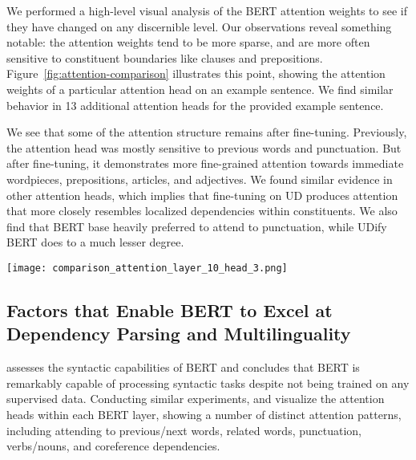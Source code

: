 \documentclass[11pt,a4paper]{article}
\begin{document}
We performed a high-level visual analysis of the BERT attention weights to see if they have changed on any discernible level.
Our observations reveal something notable: the attention weights tend to be more sparse, and are more often sensitive to constituent boundaries like clauses and prepositions.
Figure~\ref{fig:attention-comparison} illustrates this point, showing the attention weights of a particular attention head on an example sentence.
We find similar behavior in 13 additional attention heads for the provided example sentence.

We see that some of the attention structure remains after fine-tuning.
Previously, the attention head was mostly sensitive to previous words and punctuation.
But after fine-tuning, it demonstrates more fine-grained attention towards immediate wordpieces, prepositions, articles, and adjectives.
We found similar evidence in other attention heads, which implies that fine-tuning on UD produces attention that more closely resembles localized dependencies within constituents.
We also find that BERT base heavily preferred to attend to punctuation, while UDify BERT does to a much lesser degree.

\begin{figure*}[htbp]
    \centering
    \texttt{[image: comparison\_attention\_layer\_10\_head\_3.png]}
    \caption{\label{fig:attention-comparison}
        Visualization of BERT attention head 4 at layer 11, comparing the attended words on an English sentence between BERT base and UDify BERT after fine-tuning. The right column indicates the attended words (keys) with respect to the words in the left column (queries). Darker lines indicate stronger attention weights.
    }
\end{figure*}

\subsection{Factors that Enable BERT to Excel at Dependency Parsing and Multilinguality}

\citet{goldberg2019assessing} assesses the syntactic capabilities of BERT and concludes that BERT is remarkably capable of processing syntactic tasks despite not being trained on any supervised data.
Conducting similar experiments, \citet{vig2019visualizing} and \citet{sileo2019understanding} visualize the attention heads within each BERT layer, showing a number of distinct attention patterns, including attending to previous/next words, related words, punctuation, verbs/nouns, and coreference dependencies.
\end{document}
